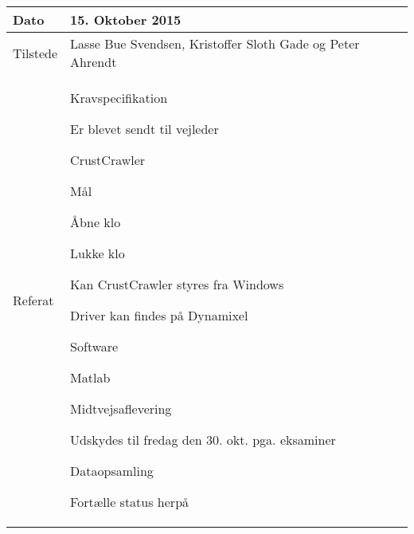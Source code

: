 \begin{center}
	\begin{tabular}{| l | p{10cm} |}
		\hline
		Dato		& 15. Oktober 2015\\ \hline
		Tilstede 	& Lasse Bue Svendsen, Kristoffer Sloth Gade og Peter Ahrendt\\ \hline
		Referat		& \vspace{-5mm}\begin{myEnumerate}
			\item Kravspecifikation
			\begin{myItemize}				
				\item Er blevet sendt til vejleder
			\end{myItemize}
			\item CrustCrawler
			\begin{myItemize}
				\item Mål
				\begin{myItemize}
					\item Åbne klo
					\item Lukke klo
				\end{myItemize}
				\item Kan CrustCrawler styres fra Windows
				\begin{myItemize}
					\item Driver kan findes på Dynamixel
					\begin{myItemize}
						\item Software
						\item Matlab
					\end{myItemize}
				\end{myItemize}
			\end{myItemize}
			\item Midtvejsaflevering
			\begin{myItemize}
				\item Udskydes til fredag den 30. okt. pga. eksaminer
			\end{myItemize}
			\item Dataopsamling
			\begin{myItemize}
				\item Fortælle status herpå
			\end{myItemize}
		\end{myEnumerate}\\ 	
		\hline
	\end{tabular}
\end{center}

